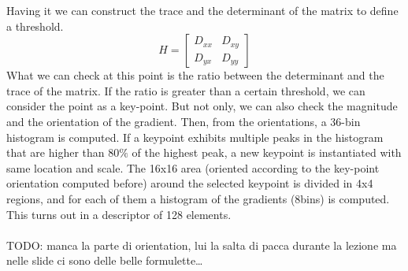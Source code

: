 Having it we can construct the trace and the determinant of the matrix to define a threshold.
\[
    H = \begin{bmatrix}
        D_{xx} & D_{xy} \\
        D_{yx} & D_{yy}
    \end{bmatrix}
\]
What we can check at this point is the ratio between the determinant and the trace of the matrix.
If the ratio is greater than a certain threshold, we can consider the point as a key-point.
But not only, we can also check the magnitude and the orientation of the gradient.
Then, from the orientations, a 36-bin histogram is computed. If a keypoint exhibits multiple peaks in the histogram that are higher than $80\%$ of the highest peak, a new keypoint is instantiated with same location and scale.
The 16x16 area (oriented according to the key-point orientation computed before) around the selected keypoint is divided in 4x4 regions, and for each of them a histogram of the gradients (8bins) is computed.
This turns out in a descriptor of 128 elements.
\\\\
TODO: manca la parte di orientation, lui la salta di pacca durante la lezione ma nelle slide ci sono delle belle formulette\dots